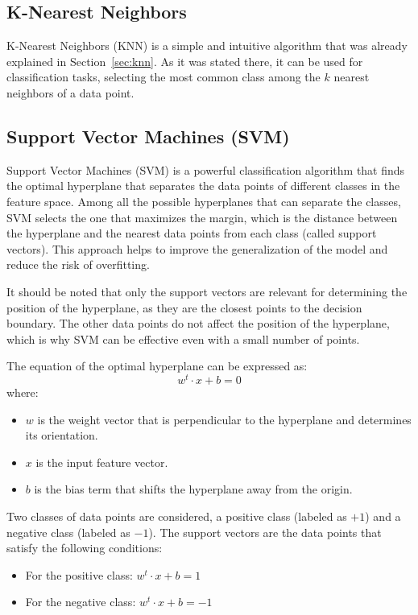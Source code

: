 \subsection{K-Nearest Neighbors}

K-Nearest Neighbors (KNN) is a simple and intuitive algorithm that was already explained in Section~\ref{sec:knn}. As it was stated there, it can be used for classification tasks, selecting the most common class among the $k$ nearest neighbors of a data point.

\subsection{Support Vector Machines (SVM)}

Support Vector Machines (SVM) is a powerful classification algorithm that finds the optimal hyperplane that separates the data points of different classes in the feature space. Among all the possible hyperplanes that can separate the classes, SVM selects the one that maximizes the margin, which is the distance between the hyperplane and the nearest data points from each class (called support vectors). This approach helps to improve the generalization of the model and reduce the risk of overfitting.
\begin{observacion}
    It should be noted that only the support vectors are relevant for determining the position of the hyperplane, as they are the closest points to the decision boundary. The other data points do not affect the position of the hyperplane, which is why SVM can be effective even with a small number of points.
\end{observacion}

The equation of the optimal hyperplane can be expressed as:
\begin{equation*}
    w^t \cdot x + b = 0
\end{equation*}
where:
\begin{itemize}
    \item $w$ is the weight vector that is perpendicular to the hyperplane and determines its orientation.
    \item $x$ is the input feature vector.
    \item $b$ is the bias term that shifts the hyperplane away from the origin.
\end{itemize}

Two classes of data points are considered, a positive class (labeled as $+1$) and a negative class (labeled as $-1$). The support vectors are the data points that satisfy the following conditions:
\begin{itemize}
    \item For the positive class: $w^t \cdot x + b = 1$
    \item For the negative class: $w^t \cdot x + b = -1$
\end{itemize}

